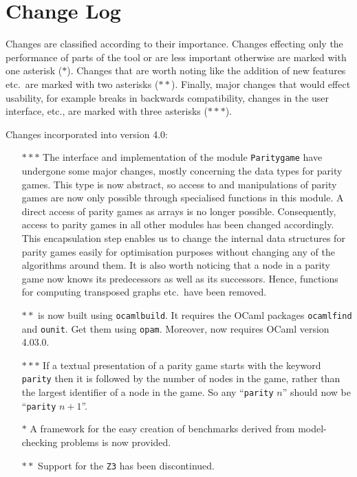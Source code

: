\section{Change Log}

Changes are classified according to their importance. Changes effecting only the performance of
parts of the tool or are less important otherwise are marked with one asterisk ($\ast$). Changes
that are worth noting like the addition of new features etc.\ are marked with two asterisks 
($\ast\ast$). Finally, major changes that would effect usability, for example breaks in backwards
compatibility, changes in the user interface, etc., are marked with three asterisks ($\ast\ast\ast$).

Changes incorporated into version 4.0:
\begin{itemize}
\item[$\ast\ast\ast$] The interface and implementation of the module \texttt{Paritygame} have undergone some major changes,
     mostly concerning the data types for parity games. This type is now abstract, so access to and manipulations of parity games
     are now only possible through specialised functions in this module. A direct access of parity games as arrays is no longer
     possible. Consequently, access to parity games in all other modules has been changed accordingly. This encapsulation step 
     enables us to change the internal data structures for parity games easily for optimisation purposes without changing any of 
     the algorithms around them. It is also worth noticing that a node in a parity game now knows its predecessors as well as its
     successors. Hence, functions for computing transposed graphs etc.\ have been removed.
\item[$\ast\ast$] \pgsolver is now built using \texttt{ocamlbuild}. It requires the OCaml packages \texttt{ocamlfind} and \texttt{ounit}.
     Get them using \texttt{opam}. Moreover, \pgsolver now requires OCaml version 4.03.0.
\item[$\ast\ast\ast$] If a textual presentation of a parity game starts with the keyword \texttt{parity} then it is followed by the number of
     nodes in the game, rather than the largest identifier of a node in the game. So any ``\texttt{parity} $n$'' should now be 
     ``\texttt{parity} $n+1$''.
\item[$\ast$] A framework for the easy creation of benchmarks derived from model-checking problems is now provided. 
\item[$\ast\ast$] Support for the \texttt{Z3} has been discontinued.  
\end{itemize}

